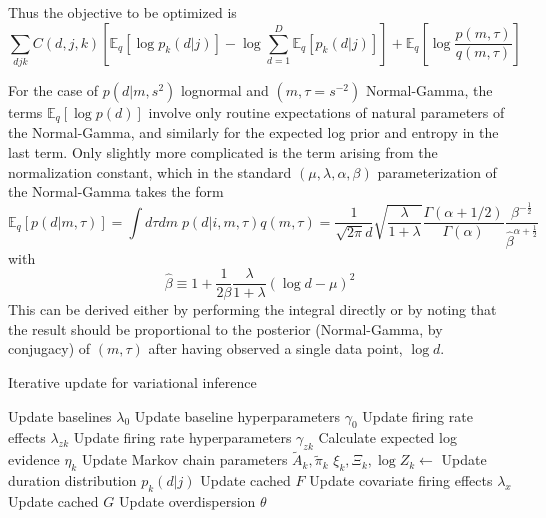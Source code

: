 \documentclass{article} %
\begin{document}
Thus the objective to be optimized is 
\begin{equation}
    \sum_{d j k} C(d, j, k) \left[\mathbb{E}_q \left[\log p_k(d|j)\right] - \log \sum_{d=1}^D \mathbb{E}_q\left[p_k(d|j) \right] \right] + \mathbb{E}_q\left[\log \frac{p(m, \tau)}{q(m, \tau)} \right] 
\end{equation}

For the case of $p(d|m, s^2)$ lognormal and $(m, \tau = s^{-2})$ Normal-Gamma, the terms $\mathbb{E}_q[\log p(d)]$ involve only routine expectations of natural parameters of the Normal-Gamma, and similarly for the expected log prior and entropy in the last term. Only slightly more complicated is the term arising from the normalization constant, which in the standard $(\mu, \lambda, \alpha, \beta)$ parameterization of the Normal-Gamma takes the form
\begin{equation}
    \mathbb{E}_q[p(d|m, \tau)] = \int d\tau dm \; p(d|i, m, \tau) q(m, \tau) 
    = \frac{1}{\sqrt{2\pi}d} \sqrt{\frac{\lambda}{1 + \lambda}} 
    \frac{\Gamma(\alpha + 1/2)}{\Gamma(\alpha)} 
    \frac{\beta^{-\frac{1}{2}}}{\hat{\beta}^{\alpha + \frac{1}{2}}}      
\end{equation}  
with
\begin{equation}
    \hat{\beta} \equiv 1 + \frac{1}{2\beta} \frac{\lambda}{1 + \lambda} 
    (\log d - \mu)^2
\end{equation}
This can be derived either by performing the integral directly or by noting that the result should be proportional to the posterior (Normal-Gamma, by conjugacy) of $(m, \tau)$ after having observed a single data point, $\log d$.

\begin{algorithm}[ht]
\caption{Iterative update for variational inference}\label{algo}
\begin{algorithmic}[1]
    \State Update baselines $\lambda_0$
    \State Update baseline hyperparameters $\gamma_0$
        \State Update firing rate effects $\lambda_{zk}$
        \State Update firing rate hyperparameters $\gamma_{zk}$
        \State Calculate expected log evidence $\eta_k$
        \State Update Markov chain parameters $\tilde{A}_k, \tilde{\pi}_k$
        \State $\xi_k, \Xi_k, \log Z_k \gets$
            \State Update duration distribution $p_k(d|j)$
        \EndIf
        \State Update cached $F$
    \EndFor
    \State Update covariate firing effects $\lambda_x$
    \State Update cached $G$
    \State Update overdispersion $\theta$
\EndProcedure
\end{algorithmic}
\end{algorithm}
\end{document}

